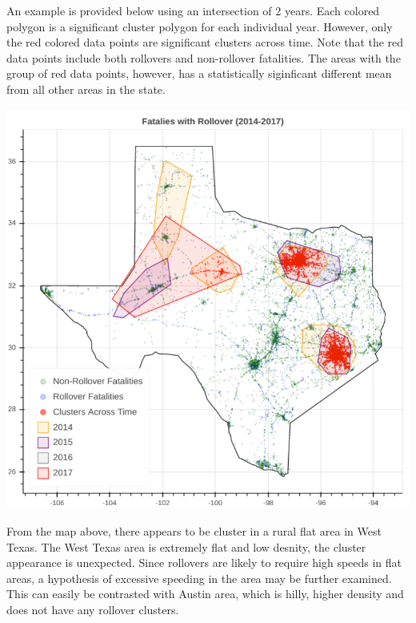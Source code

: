 \documentclass{article}
\begin{document}
An example is provided below using an intersection of 2 years. Each colored polygon is a significant cluster polygon for each individual year. However, only the red colored data points are significant clusters across time. Note that the red data points include both rollovers and non-rollover fatalities. The areas with the group of red data points, however, has a statistically siginficant different mean from all other areas in the state.
\begin{center}
\includegraphics[scale=0.4]{technical.png}
\end{center}
From the map above, there appears to be cluster in a rural flat area in West Texas. The West Texas area is extremely flat and low desnity, the cluster appearance is unexpected. Since rollovers are likely to require high speeds in flat areas, a hypothesis of excessive speeding in the area may be further examined. This can easily be contrasted with Austin area, which is hilly, higher density and does not have any rollover clusters.
\end{document}
